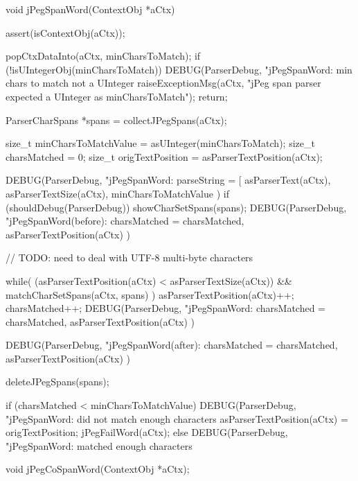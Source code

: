 \startCCode
void jPegSpanWord(ContextObj *aCtx) {
  assert(isContextObj(aCtx));

  popCtxDataInto(aCtx, minCharsToMatch);
  if (!isUIntegerObj(minCharsToMatch)) {
    DEBUG(ParserDebug,
      "jPegSpanWord: min chars to match not a UInteger%
    raiseExceptionMsg(aCtx,
      "jPeg span parser expected a UInteger as minCharsToMatch");
    return;
  }
  
  ParserCharSpans *spans = collectJPegSpans(aCtx);
  
  size_t minCharsToMatchValue = asUInteger(minCharsToMatch);
  size_t charsMatched         = 0;
  size_t origTextPosition = asParserTextPosition(aCtx);
  
  DEBUG(ParserDebug,
    "jPegSpanWord: parseString = [%
    asParserText(aCtx), asParserTextSize(aCtx), minCharsToMatchValue
  )
  if (shouldDebug(ParserDebug)) showCharSetSpans(spans);
  DEBUG(ParserDebug,
    "jPegSpanWord(before): charsMatched = %
    charsMatched, asParserTextPosition(aCtx)
  )
 
 // TODO: need to deal with UTF-8 multi-byte characters
  
  while(
    (asParserTextPosition(aCtx) < asParserTextSize(aCtx)) &&
    matchCharSetSpans(aCtx, spans)
  ) {
    asParserTextPosition(aCtx)++;
    charsMatched++;
    DEBUG(ParserDebug,
      "jPegSpanWord: charsMatched = %
      charsMatched, asParserTextPosition(aCtx)
    )
  }

  DEBUG(ParserDebug,
    "jPegSpanWord(after): charsMatched = %
    charsMatched, asParserTextPosition(aCtx)
  )

  deleteJPegSpans(spans);
 
  if (charsMatched < minCharsToMatchValue) {
    DEBUG(ParserDebug,
      "jPegSpanWord: did not match enough characters%
    asParserTextPosition(aCtx) = origTextPosition;
    jPegFailWord(aCtx);
  } else {
    DEBUG(ParserDebug,
      "jPegSpanWord: matched enough characters%
  }
}
\stopCCode

\startCHeader
void jPegCoSpanWord(ContextObj *aCtx);
\stopCHeader

